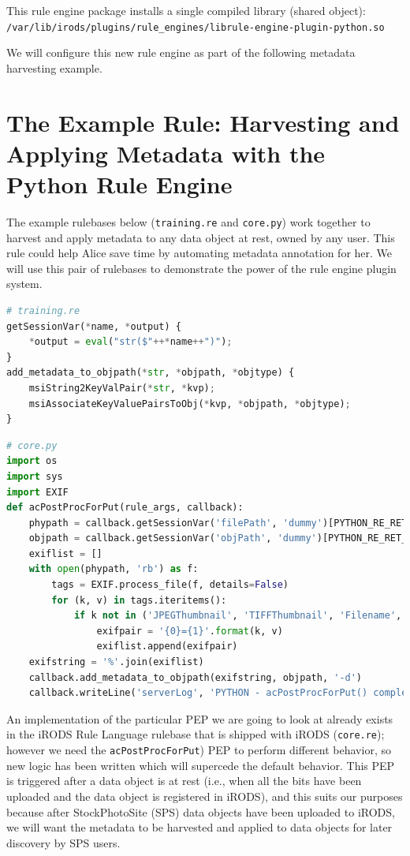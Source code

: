 \documentclass[10pt,oneside]{memoir}
\begin{document}
This rule engine package installs a single compiled library (shared object): \\ \texttt{/var/lib/irods/plugins/rule\_engines/librule-engine-plugin-python.so}

We will configure this new rule engine as part of the following metadata harvesting example.

\section{The Example Rule: Harvesting and Applying Metadata with the Python Rule Engine}

The example rulebases below (\texttt{training.re} and \texttt{core.py}) work together to harvest and apply metadata to any data object at rest, owned by any user. This rule could help Alice save time by automating metadata annotation for her. We will use this pair of rulebases to demonstrate the power of the rule engine plugin system.

\vspace{5mm}
\begin{lstlisting}[language=Python]
# training.re
getSessionVar(*name, *output) {
    *output = eval("str($"++*name++")");
}
add_metadata_to_objpath(*str, *objpath, *objtype) {
    msiString2KeyValPair(*str, *kvp);
    msiAssociateKeyValuePairsToObj(*kvp, *objpath, *objtype);
}
\end{lstlisting}

\vspace{5mm}
\begin{lstlisting}[language=Python,basicstyle=\scriptsize\ttfamily]
# core.py
import os
import sys
import EXIF
def acPostProcForPut(rule_args, callback):
    phypath = callback.getSessionVar('filePath', 'dummy')[PYTHON_RE_RET_OUTPUT][1]
    objpath = callback.getSessionVar('objPath', 'dummy')[PYTHON_RE_RET_OUTPUT][1]
    exiflist = []
    with open(phypath, 'rb') as f:
        tags = EXIF.process_file(f, details=False)
        for (k, v) in tags.iteritems():
            if k not in ('JPEGThumbnail', 'TIFFThumbnail', 'Filename', 'EXIF MakerNote'):
                exifpair = '{0}={1}'.format(k, v)
                exiflist.append(exifpair)
    exifstring = '%'.join(exiflist)
    callback.add_metadata_to_objpath(exifstring, objpath, '-d')
    callback.writeLine('serverLog', 'PYTHON - acPostProcForPut() complete')
\end{lstlisting}

An implementation of the particular PEP we are going to look at already exists in the iRODS Rule Language rulebase that is shipped with iRODS (\texttt{core.re}); however we need the \texttt{acPostProcForPut}) PEP to perform different behavior, so new logic has been written which will supercede the default behavior. This PEP is triggered after a data object is at rest (i.e., when all the bits have been uploaded and the data object is registered in iRODS), and this suits our purposes because after StockPhotoSite (SPS) data objects have been uploaded to iRODS, we will want the metadata to be harvested and applied to data objects for later discovery by SPS users.
\end{document}
